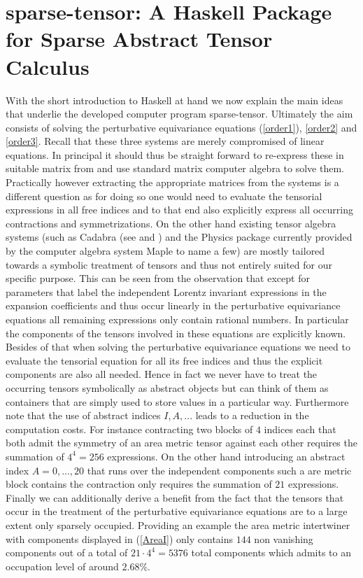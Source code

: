 \documentclass[a4paper,12pt, DIV=14, BCOR=5mm, twoside, headsepline]{scrbook}
\begin{document}
\section{sparse-tensor: A Haskell Package for Sparse Abstract Tensor Calculus}
With the short introduction to Haskell at hand we now explain the main ideas that underlie the developed computer program sparse-tensor. Ultimately the aim consists of solving the perturbative equivariance equations (\ref{order1}), \ref{order2} and \ref{order3}. Recall that these three systems are merely compromised of linear equations. In principal it should thus be straight forward to re-express these in suitable matrix from and use standard matrix computer algebra to solve them. Practically however extracting the appropriate matrices from the systems is a different question as for doing so one would need to evaluate the tensorial expressions in all free indices and to that end also
explicitly express all occurring contractions and symmetrizations. On the other hand existing tensor algebra systems (such as Cadabra (see \cite{cadabra1} and \cite{cadabra2}) and the Physics package currently provided by the computer algebra system Maple to name a few) are mostly tailored towards a symbolic treatment of tensors and thus not entirely suited for our specific purpose. 
This can be seen from the observation that except for parameters that label the independent Lorentz invariant expressions in the expansion coefficients and thus occur linearly in the perturbative equivariance equations all remaining expressions only contain rational numbers. In particular the components of the tensors involved in these equations are explicitly known. Besides of that when solving the perturbative equivariance equations we need to evaluate the tensorial equation for all its free indices and thus the explicit components are also all needed. Hence in fact we never have to treat the occurring tensors symbolically as abstract objects but can think of them as containers that are simply used to store values in a particular way. 
Furthermore note that the use of abstract indices $I, A, ...$ leads to a reduction in the computation costs. For instance contracting two blocks of $4$ indices each that both admit the symmetry of an area metric tensor against each other requires the summation of $4^4 = 256$ expressions. On the other hand introducing an abstract index $A = 0,...,20$ that runs over the independent components such a are metric block contains the contraction only requires the summation of $21$ expressions. Finally we can additionally derive a benefit from the fact that the tensors that occur in the treatment of the perturbative equivariance equations are to a large extent only sparsely occupied. Providing an example the area metric intertwiner with components displayed in (\ref{AreaI}) only contains $144$ non vanishing components out of a total of $21 \cdot 4^4 = 5376$ total components which admits to an occupation level of around $2.68 \%$.
\end{document}

